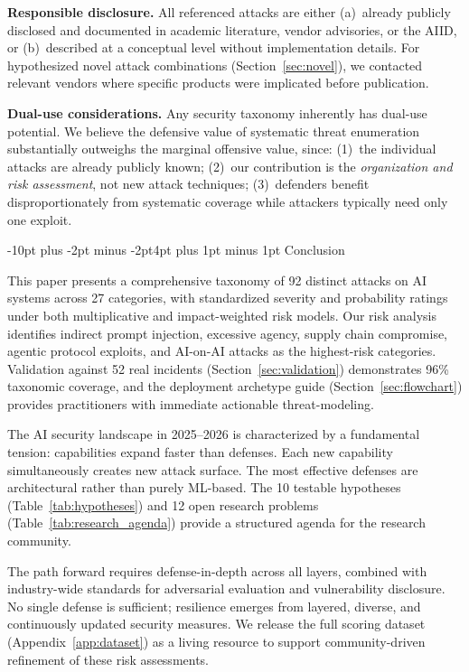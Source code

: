 \documentclass[conference]{IEEEtran}
\makeatletter
\renewcommand{\section}{\@startsection{section}{1}{\z@}%
  {-10pt plus -2pt minus -2pt}{4pt plus 1pt minus 1pt}%
  {\normalfont\large\bfseries\sffamily\color{accentdark}}}
\makeatother
\begin{document}
\textbf{Responsible disclosure.} All referenced attacks are either (a)~already publicly disclosed and documented in academic literature, vendor advisories, or the AIID, or (b)~described at a conceptual level without implementation details. For hypothesized novel attack combinations (Section~\ref{sec:novel}), we contacted relevant vendors where specific products were implicated before publication.

\textbf{Dual-use considerations.} Any security taxonomy inherently has dual-use potential. We believe the defensive value of systematic threat enumeration substantially outweighs the marginal offensive value, since: (1)~the individual attacks are already publicly known; (2)~our contribution is the \emph{organization and risk assessment}, not new attack techniques; (3)~defenders benefit disproportionately from systematic coverage while attackers typically need only one exploit.


\section{Conclusion}


This paper presents a comprehensive taxonomy of 92 distinct attacks on AI systems across 27 categories, with standardized severity and probability ratings under both multiplicative and impact-weighted risk models. Our risk analysis identifies indirect prompt injection, excessive agency, supply chain compromise, agentic protocol exploits, and AI-on-AI attacks as the highest-risk categories. Validation against 52 real incidents (Section~\ref{sec:validation}) demonstrates 96\% taxonomic coverage, and the deployment archetype guide (Section~\ref{sec:flowchart}) provides practitioners with immediate actionable threat-modeling.

The AI security landscape in 2025--2026 is characterized by a fundamental tension: capabilities expand faster than defenses. Each new capability simultaneously creates new attack surface. The most effective defenses are architectural rather than purely ML-based. The 10 testable hypotheses (Table~\ref{tab:hypotheses}) and 12 open research problems (Table~\ref{tab:research_agenda}) provide a structured agenda for the research community.

The path forward requires defense-in-depth across all layers, combined with industry-wide standards for adversarial evaluation and vulnerability disclosure. No single defense is sufficient; resilience emerges from layered, diverse, and continuously updated security measures. We release the full scoring dataset (Appendix~\ref{app:dataset}) as a living resource to support community-driven refinement of these risk assessments.
\end{document}

